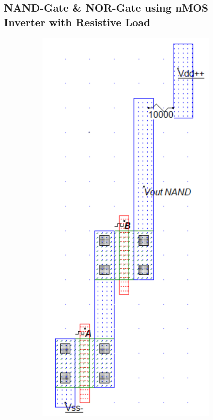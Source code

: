 \documentclass[a4paper,12pt]{article}
\begin{document}
	\subsection{NAND-Gate \& NOR-Gate using nMOS Inverter with Resistive Load}
\begin{figure}[H]
	\centering
	
	\begin{subfigure}[t]{0.49\textwidth}
		\centering
		
		\includegraphics[width=.91\linewidth]{Images5/3}
		

\end{subfigure}
\end{figure}
\end{document}
